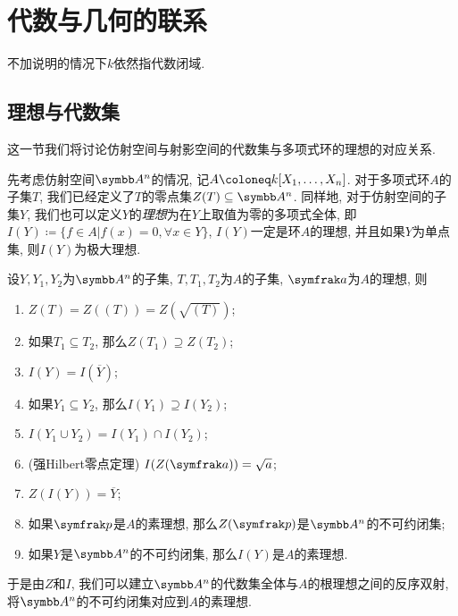 
\section{代数与几何的联系}

不加说明的情况下$k$依然指代数闭域.

\subsection{理想与代数集}

这一节我们将讨论仿射空间与射影空间的代数集与多项式环的理想的对应关系.

先考虑仿射空间$\AF^n$的情况, 记$A\coloneq \kk [X_1, \dotsc, X_n]$. 对于多项式环$A$的子集$T$, 我们已经定义了$T$的零点集$Z(T)\subseteq\AF^n$. 同样地, 对于仿射空间的子集$Y$, 我们也可以定义$Y$的\emph{理想}为在$Y$上取值为零的多项式全体, 即$I(Y)\coloneq \{f\in A\vert f(x)=0, \forall x\in Y\}$, $I(Y)$一定是环$A$的理想, 并且如果$Y$为单点集, 则$I(Y)$为极大理想.

\begin{proposition}\label{prop:affinegaloisconnectionclosedradical}
    设$Y, Y_1, Y_2$为$\AF^n$的子集, $T, T_1, T_2$为$A$的子集, $\ideal{a}$为$A$的理想, 则
    \begin{enumerate}
        \item\label{enum:prop-affine-galois-connection-closed-radical-1} $Z(T)=Z((T))=Z(\sqrt{(T)})$;
        \item\label{enum:prop-affine-galois-connection-closed-radical-2} 如果$T_1\subseteq T_2$, 那么$Z(T_1)\supseteq Z(T_2)$;
        \item\label{enum:prop-affine-galois-connection-closed-radical-3} $I(Y)=I(\overline{Y})$;
        \item\label{enum:prop-affine-galois-connection-closed-radical-4} 如果$Y_1\subseteq Y_2$, 那么$I(Y_1)\supseteq I(Y_2)$;
        \item\label{enum:prop-affine-galois-connection-closed-radical-5} $I(Y_1\cup Y_2)=I(Y_1)\cap I(Y_2)$;
        \item\label{enum:prop-affine-galois-connection-closed-radical-nullstellensatz} (强Hilbert零点定理\parencite[85, Exercise 14]{atiyah_introduction_1969}) $I(Z(\ideal{a}))=\sqrt{a}$;
        \item\label{enum:prop-affine-galois-connection-closed-radical-closure} $Z(I(Y))=\overline{Y}$;
        \item\label{enum:prop-affine-galois-connection-closed-radical-8} 如果$\ideal{p}$是$A$的素理想, 那么$Z(\ideal{p})$是$\AF^n$的不可约闭集;
        \item\label{enum:prop-affine-galois-connection-closed-radical-9} 如果$Y$是$\AF^n$的不可约闭集, 那么$I(Y)$是$A$的素理想.
    \end{enumerate}
    于是由$Z$和$I$, 我们可以建立$\AF^n$的代数集全体与$A$的根理想之间的反序双射, 将$\AF^n$的不可约闭集对应到$A$的素理想.
\end{proposition}

